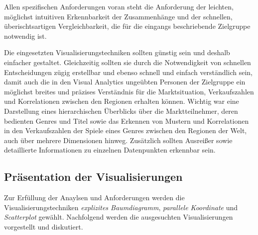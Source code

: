\documentclass[usegeometry=true]{scrartcl}
\begin{document}
Allen spezifischen Anforderungen voran steht die Anforderung der leichten, möglichst intuitiven Erkennbarkeit der Zusammenhänge und der schnellen, überischtsartigen Vergleichbarkeit,
die für die eingangs beschriebende Zielgruppe notwendig ist.

Die eingesetzten Visualisierungstechniken sollten günstig sein und deshalb einfacher gestaltet. 
Gleichzeitig sollten sie durch die Notwendigkeit von schnellen Entscheidungen zügig erstellbar und ebenso schnell und einfach verständlich sein, damit auch die in den Visual Analytics ungeübten Personen der Zielgruppe ein möglichst breites und präzises Verständnis für die Marktsituation, Verkaufszahlen und Korrelationen zwischen den Regionen erhalten können.
Wichtig war eine Darstellung eines hierarchischen Überblicks über die Marktteilnehmer, deren bedienten Genres und Titel sowie das Erkennen von Mustern und Korrelationen in den Verkaufszahlen der Spiele eines Genres zwischen den Regionen der Welt, auch über mehrere Dimensionen hinweg.
Zusätzlich sollten Ausreißer sowie detaillierte Informationen zu einzelnen Datenpunkten erkennbar sein.

\subsection{Präsentation der Visualisierungen}
Zur Erfüllung der Anaylsen und Anforderungen werden die Visualisierungstechniken \textit{explizites Baumdiagramm}, \textit{parallele Koordinate} und \textit{Scatterplot} gewählt.
Nachfolgend werden die ausgesuchten Visualisierungen vorgestellt und diskutiert. 
\end{document}
